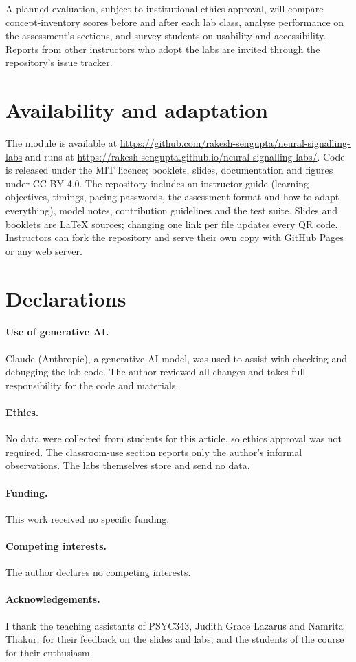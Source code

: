 \documentclass[11pt,a4paper]{article}
\newcommand{\repo}{\url{https://github.com/rakesh-sengupta/neural-signalling-labs}}
\newcommand{\site}{\url{https://rakesh-sengupta.github.io/neural-signalling-labs/}}
\begin{document}
A planned evaluation, subject to institutional ethics approval, will compare concept-inventory scores before and after each lab class, analyse performance on the assessment's sections, and survey students on usability and accessibility. Reports from other instructors who adopt the labs are invited through the repository's issue tracker.

\section{Availability and adaptation}

The module is available at \repo{} and runs at \site. Code is released under the MIT licence; booklets, slides, documentation and figures under CC BY 4.0. The repository includes an instructor guide (learning objectives, timings, pacing passwords, the assessment format and how to adapt everything), model notes, contribution guidelines and the test suite. Slides and booklets are LaTeX sources; changing one link per file updates every QR code. Instructors can fork the repository and serve their own copy with GitHub Pages or any web server.

\section*{Declarations}

\paragraph{Use of generative AI.} Claude (Anthropic), a generative AI model, was used to assist with checking and debugging the lab code. The author reviewed all changes and takes full responsibility for the code and materials.

\paragraph{Ethics.} No data were collected from students for this article, so ethics approval was not required. The classroom-use section reports only the author's informal observations. The labs themselves store and send no data.

\paragraph{Funding.} This work received no specific funding.

\paragraph{Competing interests.} The author declares no competing interests.

\paragraph{Acknowledgements.} I thank the teaching assistants of PSYC343, Judith Grace Lazarus and Namrita Thakur, for their feedback on the slides and labs, and the students of the course for their enthusiasm.



\end{document}
